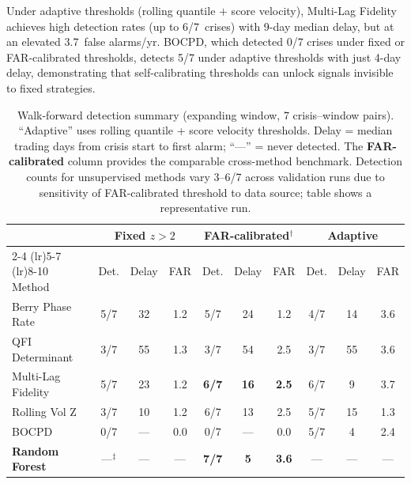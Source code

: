 \documentclass[3p]{elsarticle}
\begin{document}
Under adaptive thresholds (rolling quantile $+$ score velocity), Multi-Lag
Fidelity achieves high detection rates (up to 6/7~crises) with 9-day median delay,
but at an elevated 3.7~false alarms/yr.  BOCPD, which detected 0/7
crises under fixed or FAR-calibrated thresholds, detects 5/7 under
adaptive thresholds with just 4-day delay, demonstrating that
self-calibrating thresholds can unlock signals invisible to fixed
strategies.

\begin{table}[htb]
\centering
\caption{Walk-forward detection summary (expanding window, 7 crisis--window
  pairs).  ``Adaptive'' uses rolling quantile + score velocity
  thresholds.  Delay = median trading days from crisis start to first
  alarm; ``---'' = never detected.  The \textbf{FAR-calibrated} column
  provides the comparable cross-method benchmark.  Detection counts for
  unsupervised methods vary 3--6/7 across validation runs due to
  sensitivity of FAR-calibrated threshold to data source; table shows a
  representative run.}
\label{tab:walkforward}
\small
\begin{tabular}{lccccccccc}
\toprule
 & \multicolumn{3}{c}{Fixed $z > 2$} & \multicolumn{3}{c}{\textbf{FAR-calibrated}$^\dagger$} & \multicolumn{3}{c}{Adaptive} \\
\cmidrule(lr){2-4} \cmidrule(lr){5-7} \cmidrule(lr){8-10}
Method & Det. & Delay & FAR & Det. & Delay & FAR & Det. & Delay & FAR \\
\midrule
Berry Phase Rate   & 5/7 & 32 & 1.2 & 5/7 & 24 & 1.2 & 4/7 & 14 & 3.6 \\
QFI Determinant       & 3/7 & 55 & 1.3 & 3/7 & 54 & 2.5 & 3/7 & 55 & 3.6 \\
Multi-Lag Fidelity    & 5/7 & 23 & 1.2 & \textbf{6/7} & \textbf{16} & \textbf{2.5} & 6/7 & 9 & 3.7 \\
Rolling Vol Z         & 3/7 & 10 & 1.2 & 6/7 & 13 & 2.5 & 5/7 & 15 & 1.3 \\
BOCPD                 & 0/7 & --- & 0.0 & 0/7 & --- & 0.0 & 5/7 & 4 & 2.4 \\
\textbf{Random Forest} & ---$^\ddagger$ & --- & --- & \textbf{7/7} & \textbf{5} & \textbf{3.6} & --- & --- & --- \\
\bottomrule
\end{tabular}

\medskip
{}
\end{table}
\end{document}
